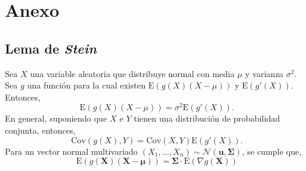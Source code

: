 \documentclass{article}
\begin{document}
\newpage
\section{Anexo}
\subsection{Lema de \textit{Stein}}
\label{sec: stein}
Sea $X$ una variable aleatoria que distribuye normal con media $\mu$ y varianza $\sigma^2$. Sea $g$ una función para la cual existen $\mathrm{E}\left(g(X)(X-\mu)\right)$ y $\mathrm{E}\left(g'(X)\right)$. Entonces,
\begin{equation*}
    \mathrm{E}\left(g(X)(X-\mu)\right) =\sigma^{2}\mathrm{E}\left(g'(X)\right).
\end{equation*}
En general, suponiendo que $X$ e $Y$ tienen una distribución de probabilidad conjunta, entonces,
\begin{equation*}
    \mathrm{Cov}\left(g(X),Y\right) = \mathrm{Cov}(X,Y)\mathrm{E}(g'(X)).
\end{equation*}
Para un vector normal multivariado $(X_{1},\dots,X_{n})\sim \mathcal{N}(\bm{u},\bm{\Sigma})$, se cumple que,
\begin{equation}
    \mathrm{E}\left(g(\bm{X})(\bm{X}-\bm{\mu})\right) = \bm{\Sigma}\cdot \mathrm{E}\left(\nabla g(\bm{X})\right)\label{stein}
\end{equation}
\end{document}
